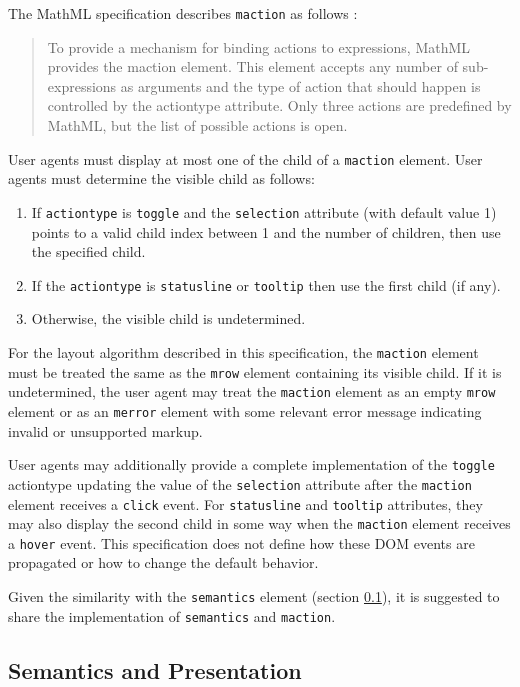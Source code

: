 The MathML specification describes {\tt maction} as follows \cite{MathML3}:
%
\begin{quote}
To provide a mechanism for binding actions to expressions, MathML provides the
maction element. This element accepts any number of sub-expressions as
arguments and the type of action that should happen is controlled by the
actiontype attribute. Only three actions are predefined by MathML, but the list
of possible actions is open.
\end{quote}
%
User agents must display at most one of the child of a {\tt maction} element.
User agents must determine the visible child as follows:
\begin{enumerate}
\item If {\tt actiontype} is {\tt toggle} and the {\tt selection} attribute
  (with default value 1) points to a valid child index
  between 1 and the number of children, then use the specified child.
\item If the {\tt actiontype} is {\tt statusline} or {\tt tooltip} then
  use the first child (if any).
\item Otherwise, the visible child is undetermined.
\end{enumerate}

For the layout algorithm described in this specification, the
{\tt maction} element must be treated the same as the {\tt mrow} element
containing its visible child. If it is undetermined,
the user agent may treat the {\tt maction} element as an
empty {\tt mrow} element or as an {\tt merror} element with some relevant error
message indicating invalid or unsupported markup.

User agents may additionally provide a complete implementation of the
{\tt toggle} actiontype updating the value of the {\tt selection} attribute
after the {\tt maction} element receives a {\tt click} event.
For {\tt statusline} and {\tt tooltip} attributes, they may also display the
second child in some way when the {\tt maction} element receives a {\tt hover}
event. This specification does not define how these DOM events are propagated
or how to change the default behavior.

Given the similarity with the {\tt semantics} element
(section \ref{semantics}), it is
suggested to share the implementation of {\tt semantics} and {\tt maction}.

\subsection{Semantics and Presentation}\label{semantics}

